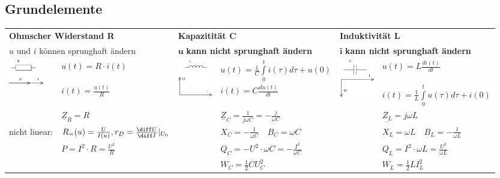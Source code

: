    	\subsection{Grundelemente}
   		\begin{tabular}{p{1.5cm} p{4.3cm} |p{1.5cm} p{4.3cm}| p{1.5cm} p{4.3cm}}
   	   		\multicolumn{2}{l}{\textbf{Ohmscher Widerstand R}}
   	   			& \multicolumn{2}{l}{\textbf{Kapazitität C}}
   	   			& \multicolumn{2}{l}{\textbf{Induktivität L}} \\
   	   		\multicolumn{2}{l}{$u$ und $i$ können sprunghaft ändern}
   	   			& \multicolumn{2}{l}{$\mathbf{u}$ \textbf{kann nicht sprunghaft ändern}}
   	   			& \multicolumn{2}{l}{$\mathbf{i}$ \textbf{kann nicht sprunghaft ändern}} \\
   	   	
   	   		\multirow{2}{1.5cm}{
   				\includegraphics[width=1.5cm]{./images/zeigerdiag-r.png}}
   				& $u(t) = R \cdot i(t)$ 
   				& \multirow{2}{1.5cm}{\includegraphics[width=1.5cm]{./images/zeigerdiag-l.png}}
   				& $u(t) = \frac{1}{C} \int\limits_0^t i(\tau) d\tau + u(0)$
   				& 
   				\multirow{2}{1.5cm}{\includegraphics[width=1.5cm]{./images/zeigerdiag-c.png}}
   				&$u(t) = L \frac{di(t)}{dt}$\\
   				
   				&$i(t) = \frac{u(t)}{R}$
   				& & $i(t) = C \frac{d u(t)}{dt}$
   				& & $i(t) = \frac{1}{L} \int\limits_0^t u(\tau) d\tau + i(0)$\\
   				
   				& $\underline{Z}_R = R$
   				& & $\underline{Z}_C = \frac{1}{j \omega C} = - \frac{j}{\omega C}$
   				& & $\underline{Z_L} = j \omega L$\\
   				
   				\parbox{1.7cm}{\small{nicht linear:}}
   				& $R_=(u) = \frac{U}{I(u)}, r_D = \frac{\diff U}{\diff I}\lvert_{U_0}$
   				& & $X_C = -\frac{1}{\omega C} \quad B_C = \omega C$
   	   			& & $X_L = \omega L
   	   			\quad B_L = -\frac{1}{\omega L}$ \\
   	   			
   	   			& $P=I^2 \cdot R = \frac{U^2}{R}$
   	   			& & $Q_C= - U^2 \cdot \omega C = - \frac{I^2}{\omega C}$
   	   			& & $Q_L= I^2 \cdot \omega L = \frac{U^2}{\omega L}$\\
   	   			
   	   			& & & $W_C=\frac12 C U_C^2$
   	   			& &$W_L=\frac12 L I_L^2$
   	   	\end{tabular}
   	
